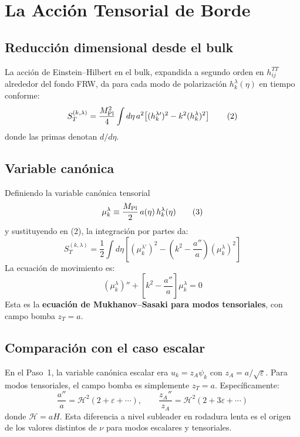 \documentclass[12pt,a4paper]{article}
\begin{document}
\section{La Acción Tensorial de Borde}

\subsection{Reducción dimensional desde el bulk}

La acción de Einstein--Hilbert en el bulk, expandida a segundo orden en $h_{ij}^{TT}$ alrededor del fondo FRW, da para cada modo de polarización $h_k^\lambda(\eta)$ en tiempo conforme:
\begin{equation}
S_T^{(k,\lambda)} = \frac{M_{\rm Pl}^2}{4}\int d\eta\, a^2\!\left[(h_k^{\lambda\prime})^2 - k^2(h_k^\lambda)^2\right] \tag{2}
\end{equation}
donde las primas denotan $d/d\eta$.

\subsection{Variable canónica}

Definiendo la variable canónica tensorial
\begin{equation}
\mu_k^\lambda \equiv \frac{M_{\rm Pl}}{2}\,a(\eta)\,h_k^\lambda(\eta) \tag{3}
\end{equation}
y sustituyendo en (2), la integración por partes da:
\begin{equation}
S_T^{(k,\lambda)} = \frac{1}{2}\int d\eta\!\left[(\mu_k^{\lambda\prime})^2 - \left(k^2 - \frac{a''}{a}\right)(\mu_k^\lambda)^2\right] \tag{4}
\end{equation}
La ecuación de movimiento es:
\begin{equation}
(\mu_k^\lambda)'' + \left[k^2 - \frac{a''}{a}\right]\mu_k^\lambda = 0 \tag{5}
\end{equation}
Esta es la \textbf{ecuación de Mukhanov--Sasaki para modos tensoriales}, con campo bomba $z_T = a$.

\subsection{Comparación con el caso escalar}

En el Paso~1, la variable canónica escalar era $u_k = z_A\psi_k$ con $z_A = a/\sqrt\varepsilon$. Para modos tensoriales, el campo bomba es simplemente $z_T = a$. Específicamente:
\begin{equation}
\frac{a''}{a} = \mathcal{H}^2(2 + \varepsilon + \cdots), \qquad \frac{z_A''}{z_A} = \mathcal{H}^2(2 + 3\varepsilon + \cdots) \tag{6}
\end{equation}
donde $\mathcal{H} = aH$. Esta diferencia a nivel subleader en rodadura lenta es el origen de los valores distintos de $\nu$ para modos escalares y tensoriales.
\end{document}
